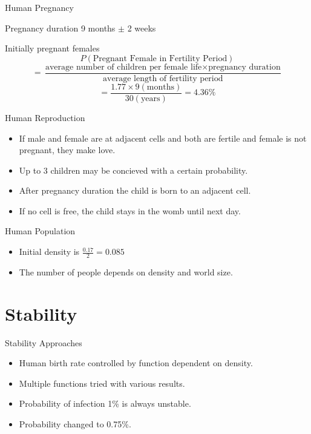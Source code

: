 \documentclass{beamer}
\begin{document}
\begin{frame}{Human Pregnancy}
    \begin{block}{Pregnancy duration}
        9 months $\pm$ 2 weeks
    \end{block}
    \begin{block}{Initially pregnant females}
        $$ P(\text{Pregnant Female in Fertility Period}) $$
        $$ = \frac{\text{average number of children per female life} \times \text{pregnancy duration}}{\text{average length of fertility period}} $$
        $$ = \frac{1.77 \times 9 (\text{months})}{30 (\text{years})} = 4.36\% $$
    \end{block}
\end{frame}

\begin{frame}{Human Reproduction}
    \begin{itemize}
        \item If male and female are at adjacent cells and both are fertile and female is not pregnant, they make love.
        \item Up to 3 children may be concieved with a certain probability.
        \item After pregnancy duration the child is born to an adjacent cell.
        \item If no cell is free, the child stays in the womb until next day. 
    \end{itemize}
\end{frame}

\begin{frame}{Human Population}
    \begin{itemize}
        \item Initial density is $ \frac{0.17}{2} = 0.085 $
        \item The number of people depends on density and world size.
    \end{itemize}
\end{frame}

\section{Stability}

\begin{frame}{Stability Approaches}
    \begin{itemize}
        \item Human birth rate controlled by function dependent on density.
        \item Multiple functions tried with various results.
        \item Probability of infection 1\% is always unstable.
        \item Probability changed to 0.75\%.
    \end{itemize}
\end{frame}
\end{document}
